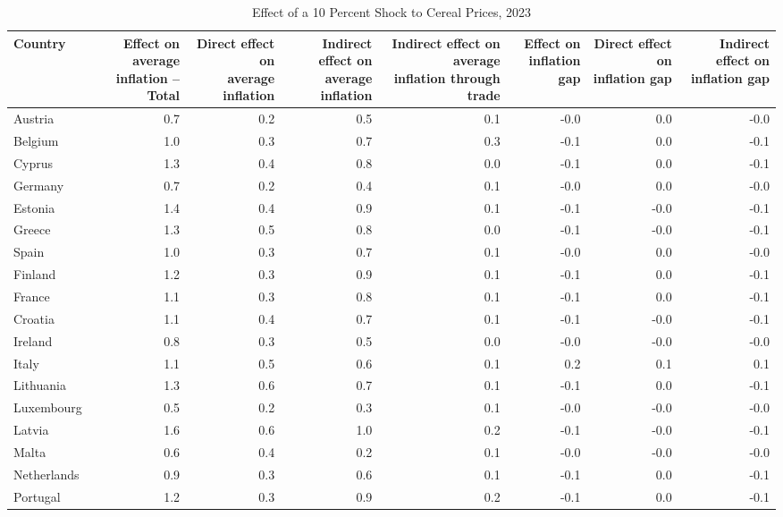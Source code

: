 \begin{table}[H]
\centering
\caption{Effect of a 10 Percent Shock to Cereal Prices, 2023}
\scriptsize
\setlength{\tabcolsep}{1.2pt}
\begin{tabular}{lrrrrrrr}
\toprule
Country & \shortstack{Effect on average\\inflation -- Total} & \shortstack{Direct effect on\\average inflation} & \shortstack{Indirect effect on\\average inflation} & \shortstack{Indirect effect on average\\inflation through trade} & \shortstack{Effect on\\inflation gap} & \shortstack{Direct effect on\\inflation gap} & \shortstack{Indirect effect on\\inflation gap}
 \\
\midrule
Austria & 0.7 & 0.2 & 0.5 & 0.1 & -0.0 & 0.0 & -0.0
 \\
Belgium & 1.0 & 0.3 & 0.7 & 0.3 & -0.1 & 0.0 & -0.1
 \\
Cyprus & 1.3 & 0.4 & 0.8 & 0.0 & -0.1 & 0.0 & -0.1
 \\
Germany & 0.7 & 0.2 & 0.4 & 0.1 & -0.0 & 0.0 & -0.0
 \\
Estonia & 1.4 & 0.4 & 0.9 & 0.1 & -0.1 & -0.0 & -0.1
 \\
Greece & 1.3 & 0.5 & 0.8 & 0.0 & -0.1 & -0.0 & -0.1
 \\
Spain & 1.0 & 0.3 & 0.7 & 0.1 & -0.0 & 0.0 & -0.0
 \\
Finland & 1.2 & 0.3 & 0.9 & 0.1 & -0.1 & 0.0 & -0.1
 \\
France & 1.1 & 0.3 & 0.8 & 0.1 & -0.1 & 0.0 & -0.1
 \\
Croatia & 1.1 & 0.4 & 0.7 & 0.1 & -0.1 & -0.0 & -0.1
 \\
Ireland & 0.8 & 0.3 & 0.5 & 0.0 & -0.0 & -0.0 & -0.0
 \\
Italy & 1.1 & 0.5 & 0.6 & 0.1 & 0.2 & 0.1 & 0.1
 \\
Lithuania & 1.3 & 0.6 & 0.7 & 0.1 & -0.1 & 0.0 & -0.1
 \\
Luxembourg & 0.5 & 0.2 & 0.3 & 0.1 & -0.0 & -0.0 & -0.0
 \\
Latvia & 1.6 & 0.6 & 1.0 & 0.2 & -0.1 & -0.0 & -0.1
 \\
Malta & 0.6 & 0.4 & 0.2 & 0.1 & -0.0 & -0.0 & -0.0
 \\
Netherlands & 0.9 & 0.3 & 0.6 & 0.1 & -0.1 & 0.0 & -0.1
 \\
Portugal & 1.2 & 0.3 & 0.9 & 0.2 & -0.1 & 0.0 & -0.1

\end{tabular}
\end{table}

